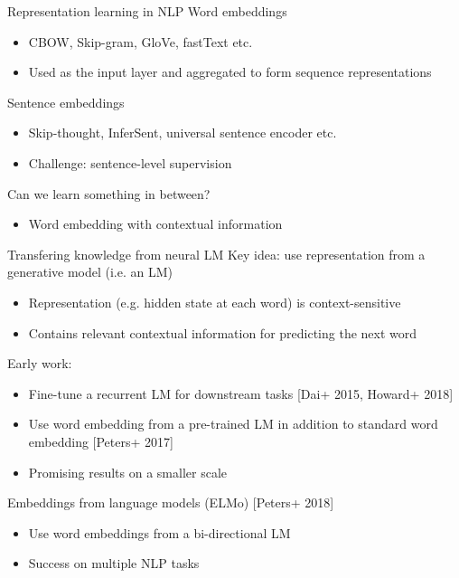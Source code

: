 \documentclass[usenames,dvipsnames,11pt,aspectratio=169]{beamer}
\begin{document}
\begin{frame}
    {Representation learning in NLP}
    Word embeddings\\
    \begin{itemize}
        \item CBOW, Skip-gram, GloVe, fastText etc.
        \item Used as the input layer and aggregated to form sequence representations
    \end{itemize}

    Sentence embeddings\\
    \begin{itemize}
        \item Skip-thought, InferSent, universal sentence encoder etc.
        \item Challenge: sentence-level supervision
    \end{itemize}

    Can we learn something in between?\\
    \begin{itemize}
        \item[] Word embedding with contextual information
    \end{itemize}
\end{frame}

\begin{frame}
    {Transfering knowledge from neural LM}
    Key idea: use representation from a generative model (i.e. an LM) \\
    \begin{itemize}
        \item Representation (e.g. hidden state at each word) is context-sensitive
        \item Contains relevant contextual information for predicting the next word
    \end{itemize}

    Early work:\\
    \begin{itemize}
        \item Fine-tune a recurrent LM for downstream tasks [Dai+ 2015, Howard+ 2018]
        \item Use word embedding from a pre-trained LM in addition to standard word embedding [Peters+ 2017]
        \item Promising results on a smaller scale
    \end{itemize}

    Embeddings from language models (ELMo) [Peters+ 2018]\\
    \begin{itemize}
        \item Use word embeddings from a bi-directional LM
        \item Success on multiple NLP tasks
    \end{itemize}
\end{frame}
\end{document}
